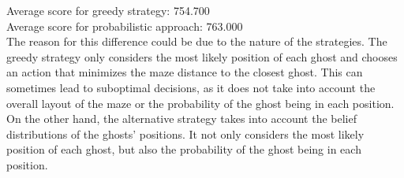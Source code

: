\documentclass[11pt]{article}
\begin{document}
    Average score for greedy strategy: 754.700\\
    Average score for probabilistic approach: 763.000\\
    The reason for this difference could be due to the nature of the strategies.
    The greedy strategy only considers the most likely position of each ghost and chooses an action that minimizes the maze distance to the closest ghost.
    This can sometimes lead to suboptimal decisions, as it does not take into account the overall layout of the maze or the probability of the ghost being in each position.
    On the other hand, the alternative strategy takes into account the belief distributions of the ghosts' positions.
    It not only considers the most likely position of each ghost, but also the probability of the ghost being in each position.
\end{document}
